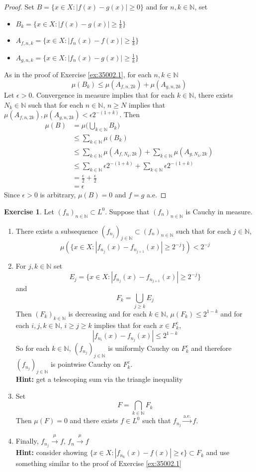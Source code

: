 \documentclass[12pt]{amsart}
\theoremstyle{definition}
\newtheorem{ex}[definition]{Exercise}
\newcommand{\ep}{\epsilon}
\newcommand{\N}{\mathbb{N}}
\newcommand{\convt}[1]{\xrightarrow{\text{#1}}}
\newcommand{\conv}[1]{\xrightarrow{#1}}
\newcommand{\lex}[1]{\label{ex:#1}}
\newcommand{\rex}[1]{Exercise \ref{ex:#1}}
\begin{document}
	\begin{proof}
	Set $B = \{x \in X: |f(x) - g(x)|  \geq 0\}$ and for $n, k \in \N$, set 
	\begin{itemize}
	\item $B_k = \{x \in X: |f(x) - g(x)| \geq  \frac{1}{k}\}$
	\item $A_{f,n,k} = \{x \in X: |f_n(x) - f(x)| \geq  \frac{1}{k}\}$
	\item $A_{g,n,k} = \{x \in X: |f_n(x) - g(x)| \geq  \frac{1}{k}\}$
	\end{itemize} 
	As in the proof of \rex{35002.1}, for each $n, k \in \N$
	$$\mu(B_k) \leq \mu(A_{f,n,2k}) + \mu(A_{g, n, 2k})$$ 
	Let $\ep >0$. Convergence in measure implies that for each $k \in \N$, there exists $N_k \in \N$ such that for each $n \in \N$, $n \geq N$ implies that $\mu(A_{f,n,2k}), \mu(A_{g,n,2k}) < \ep 2^{-(1+k)}$.
	Then 
	\begin{align*}
	\mu(B)
	&= \mu \bigg( \bigcup_{k \in \N} B_k \bigg) \\
	& \leq \sum_{k \in \N} \mu(B_k) \\
	& \leq  \sum_{k \in \N}\mu(A_{f,N_k,2k}) + \sum_{k \in \N}\mu(A_{g, N_k, 2k}) \\
	&\leq  \sum_{k \in \N} \ep 2^{-(1+k)} + \sum_{k \in \N} \ep 2^{-(1+k)} \\
	&= \frac{\ep}{2} + \frac{\ep}{2} \\
	&= \ep
\end{align*}	 
	Since $\ep >0$ is arbitrary, $\mu(B) = 0$ and $f = g$ a.e.
	\end{proof}
	
	\begin{ex} \lex{35003} 
		Let $(f_n)_{n \in \N} \subset L^0$. Suppose that $(f_n)_{n \in \N}$ is Cauchy in measure. 
		\begin{enumerate}
		\item There exists a subsequence $(f_{n_j})_{j \in \N} \subset (f_n)_{n \in \N}$ such that for each $j \in \N$, $$\mu(\{x \in X: |f_{n_j}(x) - f_{n_{j+1}}(x)| \geq 2^{-j}\}) < 2^{-j}$$
		\item For $j,k \in \N$ set 
		$$E_j = \{x \in X: |f_{n_j}(x) - f_{n_{j+1}}(x)| \geq 2^{-j}\}$$
		and 
		$$F_k = \bigcup_{j \geq k}E_j$$
		Then $(F_k)_{k \in \N}$ is decreasing and for each $k \in \N$, $\mu(F_k) \leq 2^{1-k}$ and for each $i, j, k \in \N$, $i \geq j \geq k$ implies that for each $x \in F_k^c$, $$|f_{n_i}(x) - f_{n_j}(x)| \leq 2^{1-k}$$ 
		So for each $k \in \N$, $(f_{n_j})_{j \in \N}$  is uniformly Cauchy on $F_k^c$ and therefore $(f_{n_j})_{j \in \N}$  is pointwise Cauchy on $F_k^c$. \\
		\textbf{Hint:} get a telescoping sum via the triangle inequality 
		\item Set $$F = \bigcap_{k \in \N} F_k$$ 
		Then $\mu(F) = 0$ and there exists $f \in L^0$ such that $f_{n_j} \convt{a.e.} f$.  
		\item Finally, $f_{n_j} \conv{\mu} f$, $f_n \conv{\mu} f$ \\
		\textbf{Hint:} consider showing $\{x \in X: |f_{n_k}(x) - f(x)| \geq \ep\} \subset F_k$ and use something similar to the proof of \rex{35002.1}
		\end{enumerate}  
	\end{ex}
	
\end{document}
